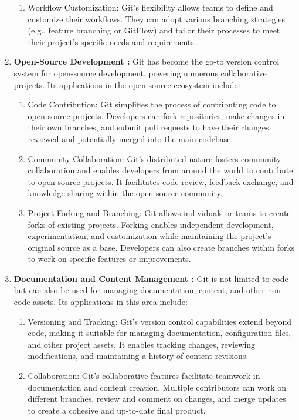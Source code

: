 \begin{enumerate}
\begin{enumerate}
        \item Workflow Customization: Git's flexibility allows teams to define and customize their workflows. They can adopt various branching strategies (e.g., feature branching or GitFlow) and tailor their processes to meet their project's specific needs and requirements.
    \end{enumerate}
    \item \textbf{Open-Source Development : }Git has become the go-to version control system for open-source development, powering numerous collaborative projects. Its applications in the open-source ecosystem include:
    \begin{enumerate}
        \item Code Contribution: Git simplifies the process of contributing code to open-source projects. Developers can fork repositories, make changes in their own branches, and submit pull requests to have their changes reviewed and potentially merged into the main codebase.
        \item Community Collaboration: Git's distributed nature fosters community collaboration and enables developers from around the world to contribute to open-source projects. It facilitates code review, feedback exchange, and knowledge sharing within the open-source community.
        \item Project Forking and Branching: Git allows individuals or teams to create forks of existing projects. Forking enables independent development, experimentation, and customization while maintaining the project's original source as a base. Developers can also create branches within forks to work on specific features or improvements.
    \end{enumerate}
    \item \textbf{Documentation and Content Management : } Git is not limited to code but can also be used for managing documentation, content, and other non-code assets. Its applications in this area include:
    \begin{enumerate}
        \item Versioning and Tracking: Git's version control capabilities extend beyond code, making it suitable for managing documentation, configuration files, and other project assets. It enables tracking changes, reviewing modifications, and maintaining a history of content revisions.

        \item Collaboration: Git's collaborative features facilitate teamwork in documentation and content creation. Multiple contributors can work on different branches, review and comment on changes, and merge updates to create a cohesive and up-to-date final product.


\end{enumerate}
\end{enumerate}
